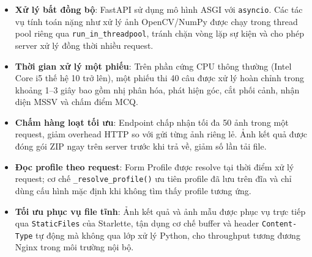 \begin{itemize}[leftmargin=1.5cm]
  \item \textbf{Xử lý bất đồng bộ}: FastAPI sử dụng mô hình ASGI với \texttt{asyncio}. Các tác vụ tính toán nặng như xử lý ảnh OpenCV/NumPy được chạy trong thread pool riêng qua \texttt{run\_in\_threadpool}, tránh chặn vòng lặp sự kiện và cho phép server xử lý đồng thời nhiều request.
  \item \textbf{Thời gian xử lý một phiếu}: Trên phần cứng CPU thông thường (Intel Core i5 thế hệ 10 trở lên), một phiếu thi 40 câu được xử lý hoàn chỉnh trong khoảng 1--3 giây bao gồm nhị phân hóa, phát hiện góc, cắt phối cảnh, nhận diện MSSV và chấm điểm MCQ.
  \item \textbf{Chấm hàng loạt tối ưu}: Endpoint  chấp nhận tối đa 50 ảnh trong một request, giảm overhead HTTP so với gửi từng ảnh riêng lẻ. Ảnh kết quả được đóng gói ZIP ngay trên server trước khi trả về, giảm số lần tải file.
  \item \textbf{Đọc profile theo request}: Form Profile được resolve tại thời điểm xử lý request; cơ chế \texttt{\_resolve\_profile()} ưu tiên profile đã lưu trên đĩa và chỉ dùng cấu hình mặc định khi không tìm thấy profile tương ứng.
  \item \textbf{Tối ưu phục vụ file tĩnh}: Ảnh kết quả và ảnh mẫu được phục vụ trực tiếp qua \texttt{StaticFiles} của Starlette, tận dụng cơ chế buffer và header \texttt{Content-Type} tự động mà không qua lớp xử lý Python, cho throughput tương đương Nginx trong môi trường nội bộ.
\end{itemize}
